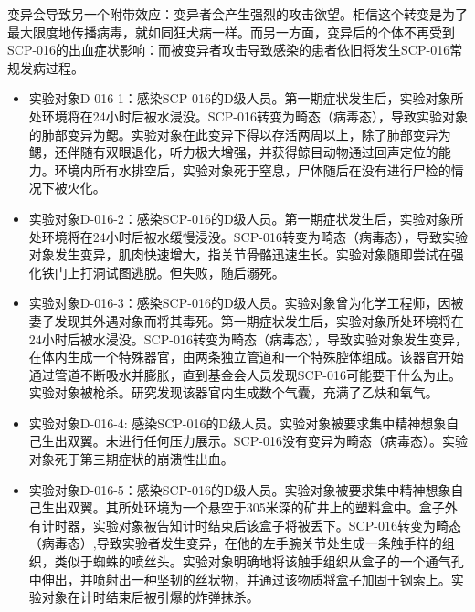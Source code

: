 变异会导致另一个附带效应：变异者会产生强烈的攻击欲望。相信这个转变是为了最大限度地传播病毒，就如同狂犬病一样。而另一方面，变异后的个体不再受到SCP-016的出血症状影响：而被变异者攻击导致感染的患者依旧将发生SCP-016常规发病过程。


\begin{itemize}
\item 实验对象D-016-1：感染SCP-016的D级人员。第一期症状发生后，实验对象所处环境将在24小时后被水浸没。SCP-016转变为畸态（病毒态），导致实验对象的肺部变异为鳃。实验对象在此变异下得以存活两周以上，除了肺部变异为鳃，还伴随有双眼退化，听力极大增强，并获得鲸目动物通过回声定位的能力。环境内所有水排空后，实验对象死于窒息，尸体随后在没有进行尸检的情况下被火化。
\item 实验对象D-016-2：感染SCP-016的D级人员。第一期症状发生后，实验对象所处环境将在24小时后被水缓慢浸没。SCP-016转变为畸态（病毒态），导致实验对象发生变异，肌肉快速增大，指关节骨骼迅速生长。实验对象随即尝试在强化铁门上打洞试图逃脱。但失败，随后溺死。
\end{itemize}


\begin{itemize}
\item 实验对象D-016-3：感染SCP-016的D级人员。实验对象曾为化学工程师，因被妻子发现其外遇对象而将其毒死。第一期症状发生后，实验对象所处环境将在24小时后被水浸没。SCP-016转变为畸态（病毒态），导致实验对象发生变异，在体内生成一个特殊器官，由两条独立管道和一个特殊腔体组成。该器官开始通过管道不断吸水并膨胀，直到基金会人员发现SCP-016可能要干什么为止。实验对象被枪杀。研究发现该器官内生成数个气囊，充满了乙炔和氧气。
\item 实验对象D-016-4: 感染SCP-016的D级人员。实验对象被要求集中精神想象自己生出双翼。未进行任何压力展示。SCP-016没有变异为畸态（病毒态）。实验对象死于第三期症状的崩溃性出血。
\item 实验对象D-016-5：感染SCP-016的D级人员。实验对象被要求集中精神想象自己生出双翼。其所处环境为一个悬空于305米深的矿井上的塑料盒中。盒子外有计时器，实验对象被告知计时结束后该盒子将被丢下。SCP-016转变为畸态（病毒态）,导致实验者发生变异，在他的左手腕关节处生成一条触手样的组织，类似于蜘蛛的喷丝头。实验对象明确地将该触手组织从盒子的一个通气孔中伸出，并喷射出一种坚韧的丝状物，并通过该物质将盒子加固于钢索上。实验对象在计时结束后被引爆的炸弹抹杀。
\end{itemize}
